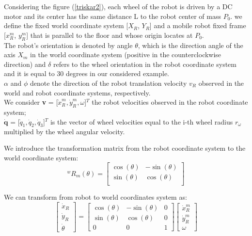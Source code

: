 Considering the figure (\ref{triskar2}), each wheel of the robot is driven by a DC motor and its center has the same distance L to the robot center of mass $P_0$. we define the fixed world coordinate system [$X_R$, $Y_R$] and a mobile robot fixed frame [${x}^m_R$, ${y}^m_R$] that is parallel to the floor and whose origin locates at $P_0$.\\
The robot's orientation is denoted by angle $\theta$, which is the direction angle of the axis $X_m$ in the world coordinate system (positive in the
counterclockwise direction) and $\delta$ refers to the wheel orientation in the robot coordinate system and it is equal to 30 degrees in our considered example.
\\
$\alpha$ and $\phi$ denote the direction of the robot translation velocity $v_R$ observed in the world and robot coordinate systems, respectively.\\
We consider \textbf{v} = [$\dot{x}^m_R,\dot{y}^m_R,\omega$]$^T$ the robot velocities observed in the robot coordinate system; \\
$\mathbf{\dot{q}}$ = [$\dot{q}_1,\dot{q}_2,\dot{q}_3$]$^T$ is the vector of wheel velocities equal to the i-th wheel radius $r_\omega$ multiplied by the wheel angular velocity.

We introduce the transformation matrix from the robot coordinate system to the world coordinate system:
\begin{equation}
^wR_m(\theta)=\begin{bmatrix}
\cos(\theta) &-\sin(\theta)\\
\sin(\theta) & \cos(\theta)\\
\end{bmatrix}
\end{equation}

We can transform from robot to world coordinates system as:
\begin{equation}
\begin{bmatrix}
\dot{x}_R\\
\dot{y}_R\\
\dot{\theta}
\end{bmatrix} =
\begin{bmatrix}
\cos(\theta) &-\sin(\theta) & 0\\
\sin(\theta) & \cos(\theta) & 0\\
0 & 0 & 1
\end{bmatrix}
\begin{bmatrix}
\dot{x}^m_R\\
\dot{y}^m_R\\
\omega
\end{bmatrix}
\label{rotation}
\end{equation}

